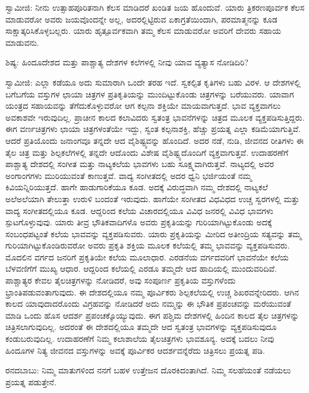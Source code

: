 ಸ್ವಾಮೀಜಿ: ನೀನು ಉತ್ಸಾಹಪೂರಿತನಾಗಿ ಕೆಲಸ ಮಾಡಿದರೆ ಖಂಡಿತ ಜಯ ಹೊಂದುವೆ. ಯಾರು ತ್ರಿಕರಣಪೂರ್ವಕ ಕೆಲಸ ಮಾಡುವರೋ ಅವರು ಜಯವೊಂದನ್ನೇ ಅಲ್ಲ, ಅದರಲ್ಲಿಟ್ಟಿರುವ ಏಕಾಗ್ರತೆಯಿಂದಾಗಿ, ಪರಮಾತ್ಮನನ್ನು ಕೂಡ ಸಾಕ್ಷಾತ್ಕರಿಸಿಕೊಳ್ಳಬಲ್ಲರು. ಯಾರು ಹೃತ್ಪೂರ್ವಕವಾಗಿ ತಮ್ಮ ಕೆಲಸ ಮಾಡುವರೋ ಅವರಿಗೆ ದೇವರು ಸಹಾಯ ಮಾಡುವನು.

ಶಿಷ್ಯ: ಹಿಂದೂದೇಶದ ಮತ್ತು ಪಾಶ್ಚಾತ್ಯ ದೇಶಗಳ ಕಲೆಗಳಲ್ಲಿ ನೀವು ಯಾವ ವ್ಯತ್ಯಾಸ ನೋಡಿದಿರಿ?

ಸ್ವಾಮೀಜಿ: ಎಲ್ಲಾ ಕಡೆಯೂ ಅದು ಸುಮಾರಾಗಿ ಒಂದೇ ತರಹ ಇದೆ. ಸ್ವಕಲ್ಪಿತ ಕೃತಿಗಳು ಬಹು ವಿರಳ. ಆ ದೇಶಗಳಲ್ಲಿ ಬಗೆಬಗೆಯ ವಸ್ತುಗಳ ಛಾಯಾ ಚಿತ್ರಗಳ ಪ್ರತಿಕೃತಿಯನ್ನು ಮುಂದಿಟ್ಟುಕೊಂಡು ಚಿತ್ರಗಳನ್ನು ಬರೆಯುವರು. ಯಾವಾಗ ಯಂತ್ರದ ಸಹಾಯವನ್ನು ತೆಗೆದುಕೊಳ್ಳುವರೋ ಆಗ ಕಲ್ಪನಾ ಶಕ್ತಿಯೇ ಮಾಯವಾಗುತ್ತದೆ. ಭಾವ ವ್ಯಕ್ತವಾಗಲು ಅವಕಾಶವೇ ಇರುವುದಿಲ್ಲ. ಪ್ರಾಚೀನ ಕಾಲದ ಕಲಾವಿದರು ಸ್ವತಂತ್ರ ಭಾವನೆಗಳನ್ನು ಚಿತ್ರದ ಮೂಲಕ ವ್ಯಕ್ತಪಡಿಸುತ್ತಿದ್ದರು. ಈಗ ವರ್ಣಚಿತ್ರಗಳು ಛಾಯಾ ಚಿತ್ರಗಳಂತೆಯೇ ಇದ್ದು, ಸ್ವಂತ ಕಲ್ಪನಾಶಕ್ತಿ, ಹೆಚ್ಚು ಪ್ರಯತ್ನ ಎಲ್ಲಾ ಕಡಿಮೆಯಾಗುತ್ತಿವೆ. ಆದರೆ ಪ್ರತಿಯೊಂದು ಜನಾಂಗವೂ ತನ್ನದೇ ಆದ ವೈಶಿಷ್ಟ್ಯವನ್ನು ಹೊಂದಿದೆ. ಅದರ ನಡೆ, ನುಡಿ, ಜೀವನದ ರೀತಿಗಳು ಈ ತೈಲ ಚಿತ್ರ ಮತ್ತು ಶಿಲ್ಪಕಲೆಗಳಲ್ಲಿ ತನ್ನದೇ ಆದೊಂದು ವಿಶೇಷ ವೈಶಿಷ್ಟ್ಯದೊಂದಿಗೆ ವ್ಯಕ್ತವಾಗುತ್ತವೆ. ಉದಾಹರಣೆಗೆ ಪಾಶ್ಚಾತ್ಯ ದೇಶದಲ್ಲಿ ಸಂಗೀತ ಮತ್ತು ನಾಟ್ಯಕಲೆಯ ಭಾವಗಳು ಬಹು ಸೂಕ್ಷ್ಮವಾಗಿರುತ್ತವೆ. ನಾಟ್ಯದಲ್ಲಿ ಅವರ ಅಂಗಾಂಗಗಳು ಮುರಿಯುವಂತೆ ಕಾಣುತ್ತವೆ. ವಾದ್ಯ ಸಂಗೀತದಲ್ಲಿ ಅದರ ಧ್ವನಿ ಭರ್ಜಿಯಂತೆ ನಮ್ಮ ಕಿವಿಯನ್ನಿರಿಯುತ್ತದೆ. ಹಾಗೇ ಹಾಡುಗಾರಿಕೆಯೂ ಕೂಡ. ಅದಕ್ಕೆ ವಿರುದ್ಧವಾಗಿ ನಮ್ಮ ದೇಶದಲ್ಲಿ ನಾಟ್ಯಕಲೆ ಅಲೆಅಲೆಯಾಗಿ ತೇಲುತ್ತಾ ಉರುಳಿ ಬಂದಂತೆ ಇರುವುದು. ಹಾಗೆಯೇ ಸಂಗೀತದ ವಿಧವಿಧದ ಉಚ್ಚ ಸ್ವರಗಳಲ್ಲಿ ಮತ್ತು ವಾದ್ಯ ಸಂಗೀತದಲ್ಲಿಯೂ ಕೂಡ. ಆದ್ದರಿಂದ ಕಲೆಯ ವಿಚಾರದಲ್ಲಿಯೂ ವಿವಿಧ ಜನರಲ್ಲಿ ವಿವಿಧ ಭಾವಗಳು ಸ್ಪುಟಗೊಳ್ಳುವುವು. ಯಾರು ತೀವ್ರ ಭೌತಿಕವಾದಿಗಳೊ ಅವರು ಪ್ರಕೃತಿಯನ್ನು ಗುರಿಯಾಗಿಟ್ಟುಕೊಂಡು ಅದಕ್ಕೆ ಸಂಬಂಧಪಟ್ಟಂತೆ ಕಲೆಯ ಭಾವವನ್ನು ವ್ಯಕ್ತಪಡಿಸುವರು. ಯಾರು ಪ್ರಕೃತಿಯನ್ನು ಮೀರಿದ ಅತೀಂದ್ರಿಯ ಸತ್ಯವನ್ನು ತಮ್ಮ ಗುರಿಯಾಗಿಟ್ಟುಕೊಂಡಿರುವರೋ ಅವರು ಪ್ರಕೃತಿ ಶಕ್ತಿಯ ಮೂಲಕ ಕಲೆಯಲ್ಲಿ ತಮ್ಮ ಭಾವವನ್ನು ವ್ಯಕ್ತಪಡಿಸುವರು. ಮೊದಲಿನ ವರ್ಗದ ಜನರಿಗೆ ಪ್ರಕೃತಿಯೇ ಕಲೆಯ ಮೂಲಾಧಾರ. ಎರಡನೆಯ ವರ್ಗದವರಿಗೆ ಭಾವನೆಯೇ ಕಲೆಯ ಬೆಳವಣಿಗೆಗೆ ಮುಖ್ಯ ಆಧಾರ. ಆದ್ದರಿಂದ ಕಲೆಯಲ್ಲಿ ಎರಡೂ ತಮ್ಮದೇ ಆದ ಹಾದಿಯಲ್ಲಿ ಮುಂದುವರಿದಿವೆ. ಪಾಶ್ಚಾತ್ಯರ ಕೇವಲ ತೈಲಚಿತ್ರಗಳನ್ನು ನೋಡಿದರೆ, ಅವು ಸಂಪೂರ್ಣ ಪ್ರಕೃತಿಯ ವಸ್ತುಗಳೆಂದು ಭ್ರಾಂತಿಪಡುವಂತಾಗುವುದು. ಈ ದೇಶದಲ್ಲಿಯೂ ನಮ್ಮ ಪೂರ್ವಿಕರು ಶಿಲ್ಪಕಲೆಯಲ್ಲಿ ಉಚ್ಚ ಶಿಖರವನ್ನೇರಿದರು. ಆಗಿನ ಕಾಲದ ಯಾವುದಾದರೊಂದು ವಿಗ್ರಹವನ್ನು ನೋಡಿದರೆ ಅದು ನಮ್ಮನ್ನು ಈ ಭೌತಿಕ ಪ್ರಪಂಚವನ್ನು ಮರೆಯುವಂತೆ ಮಾಡಿ ಒಂದು ಹೊಸ ಆದರ್ಶ ಪ್ರಪಂಚಕ್ಕೊಯ್ಯುವುದು. ಈಗ ಪಶ್ಚಿಮ ದೇಶಗಳಲ್ಲಿ ಹಿಂದಿನ ಕಾಲದ ತೈಲ ಚಿತ್ರಗಳನ್ನು ಚಿತ್ರಿಸಲಾಗುವುದಿಲ್ಲ. ಅದರಂತೆ ಈ ದೇಶದಲ್ಲಿಯೂ ತಮ್ಮದೇ ಆದ ಸ್ವತಂತ್ರ ಭಾವಗಳನ್ನು ವ್ಯಕ್ತಪಡಿಸುವುದೂ ಕಂಡುಬರುವುದಿಲ್ಲ. ಉದಾಹರಣೆಗೆ ನಿಮ್ಮ ಕಲಾಶಾಲೆಯ ತೈಲಚಿತ್ರಗಳು ಭಾವಶೂನ್ಯ. ಅದಕ್ಕೆ ಬದಲು ನೀವು ಹಿಂದೂಗಳ ನಿತ್ಯ ಜೀವನದ ವಸ್ತುಗಳನ್ನು ಅವಕ್ಕೆ ಪೂರ್ವಿಕರ ಆದರ್ಶವನ್ನೆರೆದು ಚಿತ್ರಿಸಲು ಪ್ರಯತ್ನ ಪಡಿ.

ರನದಬಾಬು: ನಿಮ್ಮ ಮಾತುಗಳಿಂದ ನನಗೆ ಬಹಳ ಉತ್ತೇಜನ ದೊರಕಿದಂತಾಗಿದೆ. ನಿಮ್ಮ ಸಲಹೆಯಂತೆ ನಡೆಯಲು ಪ್ರಯತ್ನ ಪಡುತ್ತೇನೆ.

